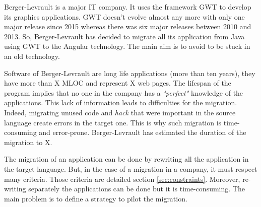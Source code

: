 \documentclass[conference]{IEEEtran}
\begin{document}
    Berger-Levrault is a major IT company.
    It uses the framework GWT to develop its graphics applications.
    GWT doesn't evolve almost any more with only one major release since 2015 whereas there was six major releases between 2010 and 2013.
    So, Berger-Levrault has decided to migrate all its application from Java using GWT to the Angular technology.
    The main aim is to avoid to be stuck in an old technology.

    Software of Berger-Levrault are long life applications (more than ten years),
        they have more than X MLOC and represent X web pages.
    The lifespan of the program implies that no one in the company has a \textit{"perfect"} knowledge of the applications.
    This lack of information leads to difficulties for the migration.
    Indeed, migrating unused code and 
        \emph{hack} that were important in the source language create errors in the target one.
    This is why such migration is time-consuming and error-prone.
    Berger-Levrault has estimated the duration of the migration to X.
    
    
    The migration of an application can be done by rewriting all the application in the target language.
    But, in the case of a migration in a company, it must respect many criteria.
    Those criteria are detailed section \ref{sec:constraints}.
    Moreover, re-writing separately the applications can be done but it is time-consuming.
    The main problem is to define a strategy to pilot the migration.

    
    
\end{document}
